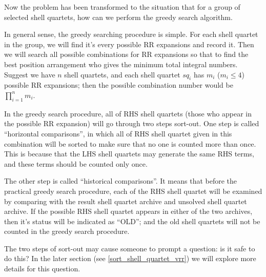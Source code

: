 Now the problem has been transformed to the situation that for a group of 
selected shell quartets, how can we perform the greedy search algorithm.

In general sense, the greedy searching procedure is simple. For each shell
quartet in the group, we will find it's every possible RR expansions and 
record it. Then we will search all possible combinations for RR expansions 
so that to find the best position arrangement who gives the minimum 
total integral numbers. Suggest we have $n$ shell quartets, and each
shell quartet $sq_{i}$ has $m_{i}$ ($m_{i} \leq 4$) possible RR expansions;
then the possible combination number would be $\prod_{i=1}^{n} m_{i}$.

In the greedy search procedure, all of RHS shell quartets (those who appear
in the possible RR expansion) will go through two steps sort-out. One
step is called ``horizontal comparisons'', in which all of RHS shell quartet
given in this combination will be sorted to make sure that no one is counted 
more than once. This is because that the LHS shell quartets may generate 
the same RHS terms, and these terms should be counted only once.

The other step is called ``historical comparisons''. It means that before 
the practical greedy search procedure, each of the RHS shell quartet will be 
examined by comparing with the result shell quartet archive and unsolved 
shell quartet archive. If the possible RHS shell quartet appears in either 
of the two archives, then it's status will be indicated as ``OLD''; and the 
old shell quartets will not be counted in the greedy search procedure.

The two steps of sort-out may cause someone to prompt a question: is it safe
to do this? In the later section (see \ref{sort_shell_quartet_vrr}) we will
explore more details for this question.

